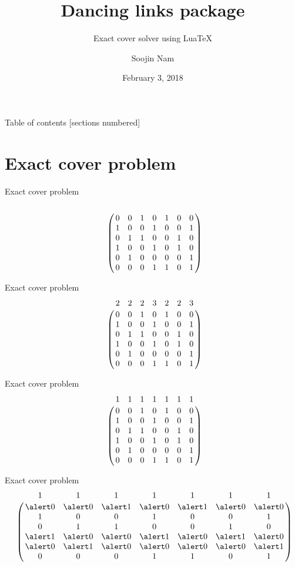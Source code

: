 \documentclass[xcolor=svgnames]{beamer}
\title{Dancing links package}
\subtitle{Exact cover solver using Lua\TeX }
\date{February 3, 2018}
\author{Soojin Nam}
\institute{The Korean \TeX\ Society}
\begin{document}
\maketitle

%
\begin{frame}{Table of contents}
  [sections numbered]
  \tableofcontents
\end{frame}


\section{Exact cover problem}

\let\a\alert
%
\begin{frame}{Exact cover problem}
\Large\boldmath
$$
\bordermatrix{
  \strut&&&&&&&\cr
  &0&0&1&0&1&0&0\cr
  &1&0&0&1&0&0&1\cr
  &0&1&1&0&0&1&0\cr
  &1&0&0&1&0&1&0\cr
  &0&1&0&0&0&0&1\cr
  &0&0&0&1&1&0&1}
$$
\end{frame}

%
\begin{frame}{Exact cover problem}
\Large\boldmath
$$
\bordermatrix{
  &2&2&2&3&2&2&3\cr
  &0&0&1&0&1&0&0\cr
  &1&0&0&1&0&0&1\cr
  &0&1&1&0&0&1&0\cr
  &1&0&0&1&0&1&0\cr
  &0&1&0&0&0&0&1\cr
  &0&0&0&1&1&0&1}
$$
\end{frame}

%
\begin{frame}{Exact cover problem}
\Large\boldmath
$$
\bordermatrix{
  &1&1&1&1&1&1&1\cr
  &0&0&1&0&1&0&0\cr
  &1&0&0&1&0&0&1\cr
  &0&1&1&0&0&1&0\cr
  &1&0&0&1&0&1&0\cr
  &0&1&0&0&0&0&1\cr
  &0&0&0&1&1&0&1}
$$
\end{frame}

%
\begin{frame}{Exact cover problem}
\Large\boldmath
$$
\bordermatrix{
  &1&1&1&1&1&1&1\cr
  &\a0&\a0&\a1&\a0&\a1&\a0&\a0\cr
  &1&0&0&1&0&0&1\cr
  &0&1&1&0&0&1&0\cr
  &\a1&\a0&\a0&\a1&\a0&\a1&\a0\cr
  &\a0&\a1&\a0&\a0&\a0&\a0&\a1\cr
  &0&0&0&1&1&0&1}
$$
\end{frame}
\end{document}
